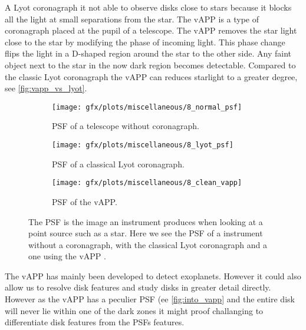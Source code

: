 A Lyot coronagraph it not able to observe disks close to stars because it blocks all the light at small separations from the star. The \ac{vAPP} \cite{vapp_snik} is a type of coronagraph placed at the pupil of a telescope. The \ac{vAPP} removes the star light close to the star by modifying the phase of incoming light. This phase change flips the light in a D-shaped region around the star to the other side. Any faint object next to the star in the now dark region becomes detectable. Compared to the classic Lyot coronagraph the \ac{vAPP} can reduces starlight to a greater degree, see \autoref{fig:vapp_vs_lyot}.  

\begin{figure}[h!]
      \begin{subfigure}[t]{0.5\textwidth}
        \texttt{[image: gfx/plots/miscellaneous/8\_normal\_psf]}
        \caption{\ac{PSF} of a telescope without coronagraph.}
        \label{fig:classic_psf}
      \end{subfigure}
      \begin{subfigure}[t]{0.5 \textwidth}
        \texttt{[image: gfx/plots/miscellaneous/8\_lyot\_psf]}
        \label{fig:lyot}
        \caption{\ac{PSF} of a classical Lyot coronagraph.}
      \end{subfigure}%
      
      \begin{subfigure}[]{0.5\textwidth}
        \texttt{[image: gfx/plots/miscellaneous/8\_clean\_vapp]}
        \caption{\ac{PSF} of the \ac{vAPP}.}
        \label{fig:into_vapp}
      \end{subfigure}
      
  \caption{The \ac{PSF} is the image an instrument produces when looking at a point source such as a star. Here we see the \ac{PSF} of a instrument without a coronagraph, with the classical Lyot coronagraph and a one using the \ac{vAPP} .}
  \label{fig:vapp_vs_lyot}
\end{figure}


The \ac{vAPP} has mainly been developed to detect exoplanets. However it could also allow us to resolve disk features and study disks in greater detail directly. However as the \ac{vAPP} has a peculier \ac{PSF} (ee \autoref{fig:into_vapp} and the entire disk will never lie within one of the dark zones it might proof challanging to differentiate disk features from the \acp{PSF} features. 

